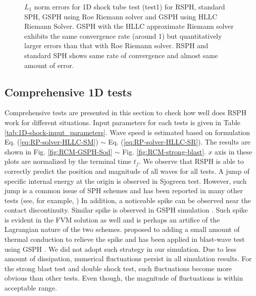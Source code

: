 \documentclass[review]{elsarticle}
\begin{document}
\begin{figure}[H]
\begin{minipage}{.332\textwidth}
    \end{minipage}%
    \caption{ $L_1$ norm errors for 1D shock tube test (test1) for RSPH, standard SPH, GSPH using Roe Riemann solver and GSPH using HLLC Riemann Solver.  GSPH with the HLLC approximate Riemann solver exhibits the same convergence rate (around 1) but quantitatively larger errors than that with Roe Riemann solver. RSPH and standard SPH shows same rate of convergence and almost same amount of error.}
    \label{fig:Accuracy-test1}
\end{figure}
 
\subsection{Comprehensive 1D tests}
Comprehensive tests are presented in this section to check how well does RSPH work for different situations. Input parameters for each tests is given in Table \ref{tab:1D-shock-input_parameters}. Wave speed is estimated based on formulation Eq. (\ref{eq:RP-solver-HLLC-SM}) $\sim$ Eq. (\ref{eq:RP-solver-HLLC-SR}).
The results are shown in Fig. \ref{fig:RCM-GSPH-Sod} $\sim$ Fig. \ref{fig:RCM-strong-blast}. $x$ axis in these plots are normalized by the terminal time $t_f$. We observe that RSPH is able to correctly predict the position and magnitude of all waves for all tests. A jump of specific internal energy at the origin is observed in Sjogreen test. However, such jump is a common issue of SPH schemes and has been reported in many other tests (see, for example, \citep{monaghan1997sph,cha2003implementations,puri2014approximate})
In addition, a noticeable spike can be observed near the contact discontinuity. Similar spike is observed in GSPH simulation \citep{puri2014comparison}. Such spike is evident in the FVM solution as well and is perhaps an artifice of the Lagrangian nature of the two schemes. \citep{noh1987errors} proposed to adding a small amount of thermal conduction to relieve the spike and has been applied in blast-wave test using GSPH \citep{puri2014comparison}. We did not adopt such strategy in our simulation.
Due to less amount of dissipation, numerical fluctuations persist in all simulation results. For the strong blast test and double shock test, such fluctuations become more obvious than other tests. Even though, the magnitude of fluctuations is within acceptable range.
\end{document}
